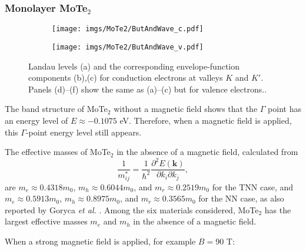 \documentclass{article}
\begin{document}
\newpage
\subsubsection*{Monolayer MoTe$_{2}$}
\begin{figure}[htb]
	\begin{subfigure}{0.495\textwidth}
		\centering
		\texttt{[image: imgs/MoTe2/ButAndWave\_c.pdf]}
	\end{subfigure}
	\begin{subfigure}{0.495\textwidth}
		\centering
		\texttt{[image: imgs/MoTe2/ButAndWave\_v.pdf]}
	\end{subfigure}
	\caption{Landau levels (a) and the corresponding envelope-function components (b),(c) for conduction electrons at valleys $K$ and $K'$. Panels (d)–(f) show the same as (a)–(c) but for valence electrons..}
\end{figure}
The band structure of MoTe$_{2}$ without a magnetic field shows that the $\Gamma$ point has an energy level of $E \approx -0.1075$ eV. Therefore, when a magnetic field is applied, this $\Gamma$-point energy level still appears.  

The effective masses of MoTe$_{2}$ in the absence of a magnetic field, calculated from  
\[
\frac{1}{m_{ij}^{*}} = \frac{1}{\hbar^{2}} \frac{\partial^{2} E(\mathbf{k})}{\partial k_{i}\partial k_{j}},
\]
are $m_{e} \approx 0.4318 m_{0}$, $m_{h} \approx 0.6044 m_{0}$, and $m_{r} \approx 0.2519 m_{0}$ for the TNN case, and $m_{e} \approx 0.5913 m_{0}$, $m_{h} \approx 0.8975 m_{0}$, and $m_{r} \approx 0.3565 m_{0}$ for the NN case, as also reported by Goryca \textit{et al.} \cite{goryca2019}. Among the six materials considered, MoTe$_{2}$ has the largest effective masses $m_{e}$ and $m_{h}$ in the absence of a magnetic field.  

When a strong magnetic field is applied, for example $B = 90$ T:  
\end{document}
